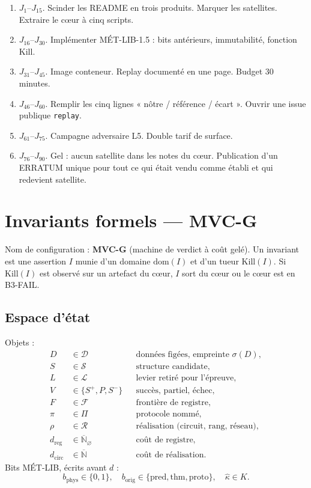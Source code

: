 \documentclass[11pt,a4paper]{article}
\newcommand{\Nbar}{\overline{\mathbb{N}}}
\newcommand{\Nempty}{\overline{\mathbb{N}}_{\varnothing}}
\theoremstyle{definition}
\begin{document}
\begin{enumerate}
  \item \(J_1\)--\(J_{15}\). Scinder les README en trois produits. Marquer les satellites. Extraire le cœur à cinq scripts.
  \item \(J_{16}\)--\(J_{30}\). Implémenter MÉT-LIB-1.5 : bits antérieurs, immutabilité, fonction \(\mathrm{Kill}\).
  \item \(J_{31}\)--\(J_{45}\). Image conteneur. Replay documenté en une page. Budget 30 minutes.
  \item \(J_{46}\)--\(J_{60}\). Remplir les cinq lignes « nôtre / référence / écart ». Ouvrir une issue publique \texttt{replay}.
  \item \(J_{61}\)--\(J_{75}\). Campagne adversaire L5. Double tarif de surface.
  \item \(J_{76}\)--\(J_{90}\). Gel : aucun satellite dans les notes du cœur. Publication d'un ERRATUM unique pour tout ce qui était vendu comme établi et qui redevient satellite.
\end{enumerate}

\section{Invariants formels --- MVC-G}
\label{sec:invariants}

Nom de configuration : \textbf{MVC-G} (machine de verdict à coût gelé).
Un invariant est une assertion $I$ munie d'un domaine $\mathrm{dom}(I)$ et d'un tueur $\mathrm{Kill}(I)$.
Si $\mathrm{Kill}(I)$ est observé sur un artefact du cœur, $I$ sort du cœur ou le cœur est en B3-FAIL.

\subsection{Espace d'état}

Objets :
\begin{align*}
D &\in \mathcal{D} && \text{données figées, empreinte } \sigma(D),\\
S &\in \mathcal{S} && \text{structure candidate},\\
L &\in \mathcal{L} && \text{levier retiré pour l'épreuve},\\
V &\in \{S^{+},P,S^{-}\} && \text{succès, partiel, échec},\\
F &\in \mathcal{F} && \text{frontière de registre},\\
\pi &\in \Pi && \text{protocole nommé},\\
\rho &\in \mathcal{R} && \text{réalisation (circuit, rang, réseau)},\\
d_{\mathrm{reg}} &\in \Nempty && \text{coût de registre},\\
d_{\mathrm{circ}} &\in \Nbar && \text{coût de réalisation}.
\end{align*}
Bits MÉT-LIB, écrits avant $d$ :
\[
b_{\mathrm{phys}}\in\{0,1\},\quad
b_{\mathrm{orig}}\in\{\mathrm{pred},\mathrm{thm},\mathrm{proto}\},\quad
\hat\kappa\in K.
\]
\end{document}

